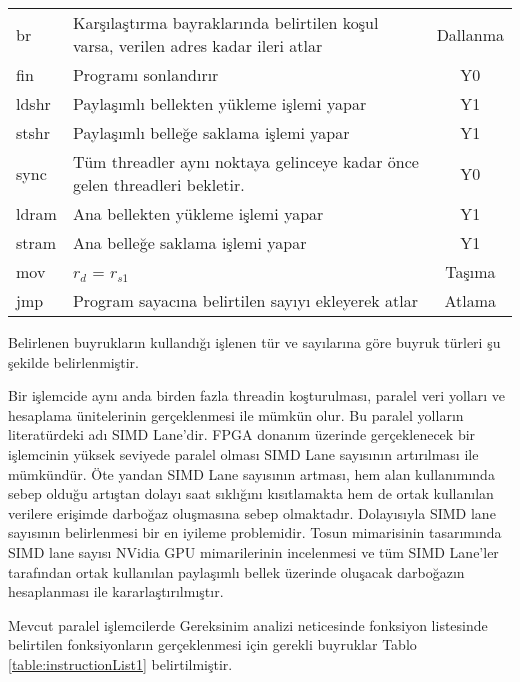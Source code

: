 \begin{longtable}{p{50pt} p{300pt} p{70pt}}
  br 			&	 Karşılaştırma bayraklarında belirtilen koşul varsa, verilen adres kadar ileri atlar & \multicolumn{1}{c}{Dallanma}  \\
  fin 		&	 Programı sonlandırır& \multicolumn{1}{c}{Y0}  \\
  ldshr 	&	 Paylaşımlı bellekten yükleme işlemi yapar& \multicolumn{1}{c}{Y1}  \\
  stshr 	&	 Paylaşımlı belleğe saklama işlemi yapar& \multicolumn{1}{c}{Y1}  \\
  sync		&	 Tüm threadler aynı noktaya gelinceye kadar önce gelen threadleri bekletir. & \multicolumn{1}{c}{Y0}  \\
  ldram 	&	 Ana bellekten yükleme işlemi yapar& \multicolumn{1}{c}{Y1}  \\
  stram		&	 Ana belleğe saklama işlemi yapar& \multicolumn{1}{c}{Y1}  \\
  mov 		&  $r_{d}$ = $r_{s1}$ 						&	\multicolumn{1}{c}{Taşıma}		 \\
  jmp  		&  Program sayacına belirtilen sayıyı ekleyerek atlar &	\multicolumn{1}{c}{Atlama}		 \\
  
\end{longtable}

Belirlenen buyrukların kullandığı işlenen tür ve sayılarına göre buyruk türleri şu şekilde belirlenmiştir. 

Bir işlemcide aynı anda birden fazla threadin koşturulması, paralel veri yolları ve hesaplama ünitelerinin gerçeklenmesi ile mümkün olur. Bu paralel yolların literatürdeki adı SIMD Lane'dir. FPGA donanım üzerinde gerçeklenecek bir işlemcinin yüksek seviyede paralel olması SIMD Lane sayısının artırılması ile mümkündür. Öte yandan SIMD Lane sayısının artması, hem alan kullanımında sebep olduğu artıştan dolayı saat sıklığını kısıtlamakta hem de ortak kullanılan verilere erişimde darboğaz oluşmasına sebep olmaktadır. Dolayısıyla SIMD lane sayısının belirlenmesi bir en iyileme problemidir. Tosun mimarisinin tasarımında SIMD lane sayısı NVidia GPU mimarilerinin incelenmesi ve tüm SIMD Lane'ler tarafından ortak kullanılan paylaşımlı bellek üzerinde oluşacak darboğazın hesaplanması ile kararlaştırılmıştır. \par

Mevcut paralel işlemcilerde  Gereksinim analizi neticesinde fonksiyon listesinde belirtilen fonksiyonların gerçeklenmesi için gerekli buyruklar Tablo \ref{table:instructionList1} belirtilmiştir. 
